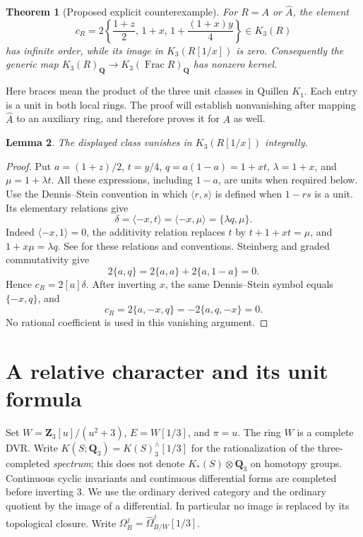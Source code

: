 \documentclass[11pt,a4paper]{article}
\newtheorem{theorem}{Theorem}[section]
\newtheorem{lemma}[theorem]{Lemma}
\theoremstyle{remark}
\newcommand{\Q}{\mathbf Q}
\newcommand{\Z}{\mathbf Z}
\newcommand{\Frac}{\operatorname{Frac}}
\begin{document}
\begin{theorem}[Proposed explicit counterexample]\label{thm:shortmain}
For $R=A$ or $\widehat A$, the element
\[
 \boxed{\quad c_R=2\left\{\frac{1+z}{2},\,1+x,\,
                 1+\frac{(1+x)y}{4}\right\}\in K_3(R)\quad}
\]
has infinite order, while its image in $K_3(R[1/x])$ is zero.
Consequently the generic map
$K_3(R)_{\Q}\to K_3(\Frac R)_{\Q}$ has nonzero kernel.
\end{theorem}
Here braces mean the product of the three unit classes in Quillen
$K_1$. Each entry is a unit in both local rings. The proof will establish
nonvanishing after mapping $\widehat A$ to an auxiliary ring, and
therefore proves it for $A$ as well.

\begin{lemma}\label{lem:shortgenericzero}
The displayed class vanishes in $K_3(R[1/x])$ integrally.
\end{lemma}
\begin{proof}
Put $a=(1+z)/2$, $t=y/4$, $q=a(1-a)=1+xt$,
$\lambda=1+x$, and $\mu=1+\lambda t$. All these expressions,
including $1-a$, are units when required below. Use the
Dennis--Stein convention in which $\langle r,s\rangle$ is defined
when $1-rs$ is a unit. Its elementary relations give
\[
 \delta=\langle-x,t\rangle
       =\langle-x,\mu\rangle=\{\lambda q,\mu\}.
\]
Indeed $\langle-x,1\rangle=0$, the additivity relation replaces
$t$ by $t+1+xt=\mu$, and $1+x\mu=\lambda q$.
See \cite[III, Definition~5.11 and (D1)--(D3)]{Weibel} for these
relations and conventions. Steinberg and graded commutativity give
\[
 2\{a,q\}=2\{a,a\}+2\{a,1-a\}=0.
\]
Hence $c_R=2[a]\delta$. After inverting $x$, the same
Dennis--Stein symbol equals $\{-x,q\}$, and
\[
 c_R=2\{a,-x,q\}=-2\{a,q,-x\}=0.
\]
No rational coefficient is used in this vanishing argument.
\end{proof}

\section{A relative character and its unit formula}
Set $W=\Z_3[u]/(u^2+3)$, $E=W[1/3]$, and $\pi=u$.
The ring $W$ is a complete DVR. Write
$K(S;\Q_3)=K(S)^{\wedge}_3[1/3]$ for the rationalization of the
three-completed \emph{spectrum}; this does not denote
$K_*(S)\otimes\Q_3$ on homotopy groups.
Continuous cyclic invariants and continuous differential forms are
completed before inverting $3$. We use the ordinary derived category
and the ordinary quotient by the image of a differential.
In particular no image is replaced by its topological closure.
Write $\Omega_B^j=\widehat\Omega^j_{B/W}[1/3]$.
\end{document}
